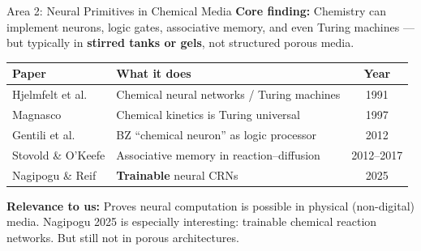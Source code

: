 \documentclass[aspectratio=169,11pt]{beamer}
\begin{document}
\begin{frame}{Area 2: Neural Primitives in Chemical Media}
  \textbf{Core finding:} Chemistry can implement neurons, logic gates, associative memory, and even Turing machines --- but typically in \textbf{stirred tanks or gels}, not structured porous media.

  \vspace{0.2cm}
  \begin{table}
    \centering
    \footnotesize
    \renewcommand{\arraystretch}{1.05}
    \begin{tabular}{@{}>{\raggedright}p{3.2cm}>{\raggedright}p{5.8cm}c@{}}
      \toprule
      \textbf{Paper} & \textbf{What it does} & \textbf{Year} \\
      \midrule
      Hjelmfelt et al. & Chemical neural networks / Turing machines & 1991 \\
      Magnasco & Chemical kinetics is Turing universal & 1997 \\
      Gentili et al. & BZ ``chemical neuron'' as logic processor & 2012 \\
      Stovold \& O'Keefe & Associative memory in reaction--diffusion & 2012--2017 \\
      Nagipogu \& Reif & \textbf{Trainable} neural CRNs & 2025 \\
      \bottomrule
    \end{tabular}
  \end{table}

  \vspace{0.1cm}
  \textbf{Relevance to us:} Proves neural computation is possible in physical (non-digital) media. Nagipogu 2025 is especially interesting: trainable chemical reaction networks. But still not in porous architectures.
\end{frame}
\end{document}
